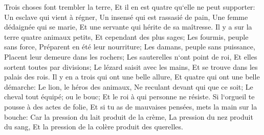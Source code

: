 \verse Trois choses font trembler la terre, Et il en est quatre qu`elle ne peut supporter: 
\verse Un esclave qui vient à régner, Un insensé qui est rassasié de pain, 
\verse Une femme dédaignée qui se marie, Et une servante qui hérite de sa maîtresse. 
\verse Il y a sur la terre quatre animaux petits, Et cependant des plus sages; 
\verse Les fourmis, peuple sans force, Préparent en été leur nourriture; 
\verse Les damans, peuple sans puissance, Placent leur demeure dans les rochers; 
\verse Les sauterelles n`ont point de roi, Et elles sortent toutes par divisions; 
\verse Le lézard saisit avec les mains, Et se trouve dans les palais des rois. 
\verse Il y en a trois qui ont une belle allure, Et quatre qui ont une belle démarche: 
\verse Le lion, le héros des animaux, Ne reculant devant qui que ce soit; 
\verse Le cheval tout équipé; ou le bouc; Et le roi à qui personne ne résiste. 
\verse Si l`orgueil te pousse à des actes de folie, Et si tu as de mauvaises pensées, mets la main sur la bouche: 
\verse Car la pression du lait produit de la crème, La pression du nez produit du sang, Et la pression de la colère produit des querelles. 

\chapter{}

